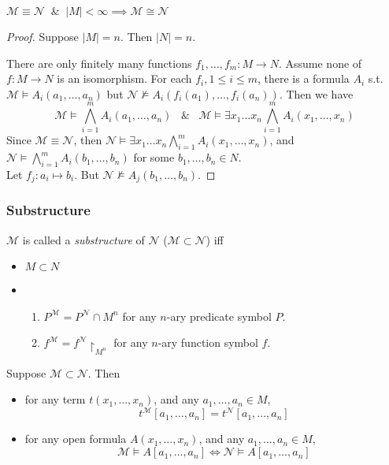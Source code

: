 \documentclass[UTF8,11pt,colorlinks,compress,openany]{beamer}%
\begin{document}
\begin{frame}\frametitle{}
\begin{theorem}
$\mathcal{M}\equiv\mathcal{N}\;\;\&\;\;|M|<\infty\implies\mathcal{M}\cong\mathcal{N}$
\end{theorem}
\begin{proof}
Suppose $|M|=n$. Then $|N|=n$.

There are only finitely many functions $f_1,\dots,f_m: M\to N$. Assume none of $f: M\to N$ is an isomorphism. For each $f_i, 1\leq i\leq m$, there is a formula $A_i$ s.t. $\mathcal{M}\vDash A_i(a_1,\dots,a_n)$ but $\mathcal{N}\nvDash A_i(f_i(a_1),\dots,f_i(a_n))$. Then we have
\[\mathcal{M}\vDash\bigwedge\limits_{i=1}^m A_i(a_1,\dots,a_n)\;\;\;\&\;\;\;\mathcal{M}\vDash\exists x_1\dots x_n\bigwedge\limits_{i=1}^m A_i(x_1,\dots,x_n)\]
Since $\mathcal{M}\equiv\mathcal{N}$, then $\mathcal{N}\vDash\exists x_1\dots x_n\bigwedge\limits_{i=1}^m A_i(x_1,\dots,x_n)$, and $\mathcal{N}\vDash\bigwedge\limits_{i=1}^m A_i(b_1,\dots,b_n)$ for some $b_1,\dots,b_n\in N$.\\
Let $f_j: a_i\mapsto b_i$. But $\mathcal{N}\nvDash A_j(b_1,\dots,b_n)$.
\end{proof}
\end{frame}

\begin{frame}\frametitle{Substructure}
	\begin{definition}[Substructure]
		$\mathcal{M}$ is called a \emph{substructure} of $\mathcal{N}$ ($\mathcal{M}\subset\mathcal{N}$) iff
		\begin{itemize}
			\item $M\subset N$
			\item
			\begin{enumerate}
				\item $P^{\mathcal{M}}=P^{\mathcal{N}}\cap M^n$ for any $n$-ary predicate symbol $P$.
				\item $f^{\mathcal{M}}=f^{\mathcal{N}}{\restriction_{M^n}}$ for any $n$-ary function symbol $f$.
			\end{enumerate}
		\end{itemize}
	\end{definition}
	\begin{block}{}
	Suppose $\mathcal{M}\subset\mathcal{N}$. Then
		\begin{itemize}
			\item for any term $t(x_1,\dots,x_n)$, and any $a_1,\dots,a_n\in M$,
			\[t^{\mathcal{M}}[a_1,\dots,a_n]=t^{\mathcal{N}}[a_1,\dots,a_n]\]
			\item for any open formula $A(x_1,\dots,x_n)$, and any $a_1,\dots,a_n\in M$,
			\[\mathcal{M}\vDash A[a_1,\dots,a_n]\iff\mathcal{N}\vDash A[a_1,\dots,a_n]\]
		\end{itemize} 
	\end{block}
\end{frame}
\end{document}
